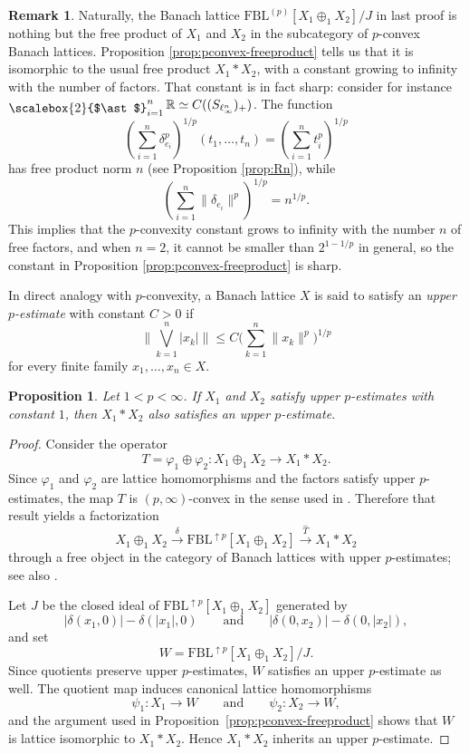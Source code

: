 \documentclass[12pt]{amsart}
\newcommand{\FBL}{\mathrm{FBL}}
\DeclareMathOperator*{\bigfree}{\raisebox{-0.6ex}{\scalebox{2}{$\ast$}}}
\theoremstyle{plain}
\newtheorem{proposition}[theorem]{Proposition}
\theoremstyle{definition}
\newtheorem{remark}[theorem]{Remark}
\begin{document}
\begin{remark}
Naturally, the Banach lattice $\FBL^{(p)}[X_1\oplus_1 X_2]/J$ in last proof is nothing but the free product of $X_1$ and $X_2$ in the subcategory of $p$-convex Banach lattices. Proposition \ref{prop:pconvex-freeproduct} tells us that it is isomorphic to the usual free product $X_1*X_2$, with a constant growing to infinity with the number of factors. That constant is in fact sharp: consider for instance $\bigfree_{i=1}^n\mathbb{R}\simeq C((S_{\ell_\infty^n})_+)$. The function \[
(\sum_{i=1}^n \delta_{e_i}^p)^{1/p}(t_1,\ldots,t_n)=(\sum_{i=1}^n t_i^p)^{1/p}
\]
has free product norm $n$ (see Proposition \ref{prop:Rn}), while \[
(\sum_{i=1}^n\|\delta_{e_i}\|^p)^{1/p}=n^{1/p}.
\]
This implies that the $p$-convexity constant grows to infinity with the number $n$ of free factors, and when $n=2$, it cannot be smaller than $2^{1-1/p}$ in general, so the constant in Proposition \ref{prop:pconvex-freeproduct} is sharp.
\end{remark}

In direct analogy with $p$-convexity, a Banach lattice $X$ is said to satisfy an \emph{upper $p$-estimate} with constant $C>0$ if
\[
\Big\|\bigvee_{k=1}^n |x_k|\Big\|
\leq
C\Big(\sum_{k=1}^n \|x_k\|^p\Big)^{1/p}
\]
for every finite family $x_1,\dots,x_n\in X$.

\begin{proposition}
Let $1<p<\infty$. If $X_1$ and $X_2$ satisfy upper $p$-estimates with constant $1$, then $X_1\ast X_2$ also satisfies an upper $p$-estimate.
\end{proposition}

\begin{proof}
Consider the operator
\[
T=\varphi_1\oplus \varphi_2:X_1\oplus_1 X_2\to X_1\ast X_2.
\]
Since $\varphi_1$ and $\varphi_2$ are lattice homomorphisms and the factors satisfy upper $p$-estimates, the map $T$ is $(p,\infty)$-convex in the sense used in \cite[Corollary~9.37]{freebanlat}. Therefore that result yields a factorization
\[
X_1\oplus_1 X_2 \xrightarrow{\ \delta\ } \FBL^{\uparrow p}[X_1\oplus_1 X_2] \xrightarrow{\ \widehat{T}\ } X_1\ast X_2
\]
through a free object in the category of Banach lattices with upper $p$-estimates; see also \cite{p-convex-renorming-factorization}.

Let $J$ be the closed ideal of $\FBL^{\uparrow p}[X_1\oplus_1 X_2]$ generated by
\[
|\delta(x_1,0)|-\delta(|x_1|,0)
\qquad\text{and}\qquad
|\delta(0,x_2)|-\delta(0,|x_2|),
\]
and set
\[
W=\FBL^{\uparrow p}[X_1\oplus_1 X_2]/J.
\]
Since quotients preserve upper $p$-estimates, $W$ satisfies an upper $p$-estimate as well. The quotient map induces canonical lattice homomorphisms
\[
\psi_1:X_1\to W
\qquad\text{and}\qquad
\psi_2:X_2\to W,
\]
and the argument used in Proposition~\ref{prop:pconvex-freeproduct} shows that $W$ is lattice isomorphic to $X_1\ast X_2$. Hence $X_1\ast X_2$ inherits an upper $p$-estimate.
\end{proof}
\end{document}
